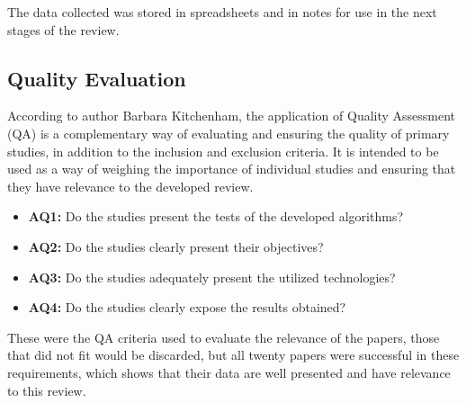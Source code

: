 \documentclass[alpha-refs,english]{RBCA_v3.0}
\begin{document}
The data collected was stored in spreadsheets and in notes for use in the next stages of the review.

\subsection{Quality Evaluation}
According to author Barbara Kitchenham, the application of Quality Assessment (QA) is a complementary way of evaluating and ensuring the quality of primary studies, in addition to the inclusion and exclusion criteria. It is intended to be used as a way of weighing the importance of individual studies and ensuring that they have relevance to the developed review.
\begin{itemize}
	\item \textbf{AQ1:}  Do the studies present the tests of the developed algorithms?
	\item \textbf{AQ2:} Do the studies clearly present their objectives?
	\item \textbf{AQ3:} Do the studies adequately present the utilized technologies?
	\item \textbf{AQ4:} Do the studies clearly expose the results obtained?
\end{itemize}

These were the QA criteria used to evaluate the relevance of the papers, those that did not fit would be discarded, but all twenty papers were successful in these requirements, which shows that their data are well presented and have relevance to this review.
\end{document}
